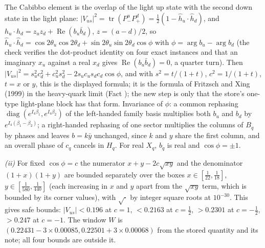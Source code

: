 The Cabibbo element is the overlap of the light up state with the second down state in the light plane: $|V_{us}|^{2} = \operatorname{tr}(P^{u}_{-}P^{d}_{+}) = \tfrac12(1 - \hat{h}_{u}\cdot\hat{h}_{d})$, and $h_{u}\cdot h_{d} = z_{u}z_{d} + \operatorname{Re}(b_{u}\bar{b}_{d})$, $z = (a - d)/2$, so $\hat{h}_{u}\cdot\hat{h}_{d} = \cos 2\theta_{u}\cos 2\theta_{d} + \sin 2\theta_{u}\sin 2\theta_{d}\cos\phi$ with $\phi = \arg b_{u} - \arg b_{d}$ (the check verifies the dot-product identity on four exact instances and that an imaginary $x_{u}$ against a real $x_{d}$ gives $\operatorname{Re}(b_{u}\bar{b}_{d}) = 0$, a quarter turn). Then $|V_{us}|^{2} = s_{u}^{2}c_{d}^{2} + c_{u}^{2}s_{d}^{2} - 2s_{u}c_{u}s_{d}c_{d}\cos\phi$, and with $s^{2} = t/(1 + t)$, $c^{2} = 1/(1 + t)$, $t = x$ or $y$, this is the displayed formula; it is the formula of Fritzsch and Xing (1999) in the heavy-quark limit (Fact ); the new step is only that the store's one-type light-plane block has that form. Invariance of $\phi$: a common rephasing $\operatorname{diag}(e^{I_4\beta_{1}}, e^{I_4\beta_{2}})$ of the left-handed family basis multiplies both $b_{u}$ and $b_{d}$ by $e^{I_4(\beta_{1} - \beta_{2})}$; a right-handed rephasing of one sector multiplies the columns of $B_{q}$ by phases and leaves $b = k\bar{y}$ unchanged, since $k$ and $y$ share the first column, and an overall phase of $c_{q}$ cancels in $H_{q}$. For real $X_{q}$, $b_{q}$ is real and $\cos\phi = \pm1$.

\emph{(ii)} For fixed $\cos\phi = c$ the numerator $x + y - 2c\sqrt{xy}$ and the denominator $(1 + x)(1 + y)$ are bounded separately over the boxes $x \in [\tfrac{1}{22}, \tfrac{1}{18}]$, $y \in [\tfrac{1}{580}, \tfrac{1}{440}]$ (each increasing in $x$ and $y$ apart from the $\sqrt{xy}$ term, which is bounded by its corner values), with $\sqrt{\cdot}$ by integer square roots at $10^{-30}$. This gives safe bounds: $|V_{us}| < 0.196$ at $c = 1$, $< 0.2163$ at $c = \tfrac12$, $> 0.2301$ at $c = -\tfrac12$, $> 0.247$ at $c = -1$. The window $W$ is $(0.22431 - 3 \times 0.00085, 0.22501 + 3 \times 0.00068)$ from the stored quantity and its note; all four bounds are outside it.

